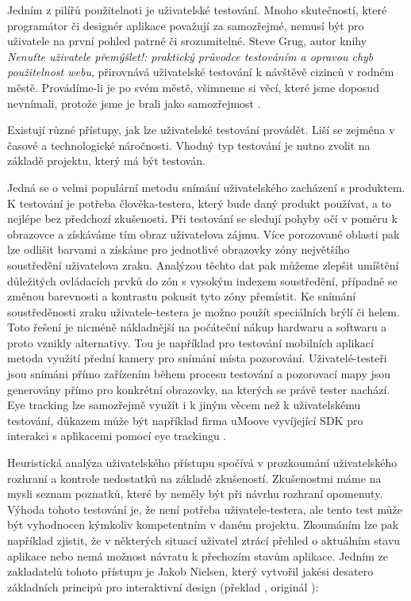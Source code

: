 \documentclass[twoside,12pt]{article}
\begin{document}
\newpage

Jedním z pilířů použitelnoti je uživatelské testování. Mnoho skutečností, které programátor či designér aplikace považují za samozřejmé, nemusí být pro uživatele na první pohled patrné či srozumitelné. Steve Grug, autor knihy \textit{Nenuťte uživatele přemýšlet!: praktický průvodce testováním a opravou chyb použitelnost webu}, přirovnává uživatelské testování k návštěvě cizinců v rodném městě. Provádíme-li je po svém městě, všimneme si věcí, které jsme doposud nevnímali, protože jsme je brali jako samozřejmost \cite{krug_steve}.

Existují různé přístupy, jak lze uživatelské testování provádět. Liší se zejména v časové a technologické náročnosti. Vhodný typ testování je nutno zvolit na základě projektu, který má být testován. 

Jedná se o velmi populární metodu snímání uživatelského zacházení s produktem. K testování je potřeba člověka-testera, který bude daný produkt používat, a to nejlépe bez předchozí zkušenosti. Při testování se sledují pohyby očí v poměru k obrazovce a získáváme tím obraz uživatelova zájmu. Více porozované oblasti pak lze odlišit barvami a získáme pro jednotlivé obrazovky zóny největšího soustředění uživatelova zraku. Analýzou těchto dat pak můžeme zlepšit umíštění důležitých ovládacích prvků do zón s vysokým indexem soustředění, případně se změnou barevnosti a kontrastu pokusit tyto zóny přemístit. Ke snímání soustředěnosti zraku uživatele-testera je možno použít speciálních brýlí či helem. Toto řešení je nicméně nákladnější na počáteční nákup hardwaru a softwaru a proto vznikly alternativy. Tou je například pro testování mobilních aplikací metoda využití přední kamery pro snímání místa pozorování. Uživatelé-testeři jsou snímáni přímo zařízením během procesu testování a pozorovací mapy jsou generovány přímo pro konkrétní obrazovky, na kterých se právě tester nachází. Eye tracking lze samozřejmě využít i k jiným věcem než k uživatelskému testování, důkazem může být například firma uMoove vyvíjející SDK pro interakci s aplikacemi pomocí eye trackingu \cite{umoove}.

Heuristická analýza uživatelského přístupu spočívá v prozkoumání uživatelského rozhraní a kontrole nedostatků na základě zkušeností. Zkušenostmi máme na mysli seznam poznatků, které by neměly být při návrhu rozhraní opomenuty. Výhoda tohoto testování je, že není potřeba uživatele-testera, ale tento test může být vyhodnocen kýmkoliv kompetentním v daném projektu. Zkoumáním lze pak například zjistit, že v některých situací uživatel ztrácí přehled o aktuálním stavu aplikace nebo nemá možnost návratu k přechozím stavům aplikace. Jedním ze zakladatelů tohoto přístupu je Jakob Nielsen, který vytvořil jakési desatero základních principů pro interaktivní design (překlad \cite{lichnovskakarberova}, originál \cite{nielsen}): 
\end{document}
